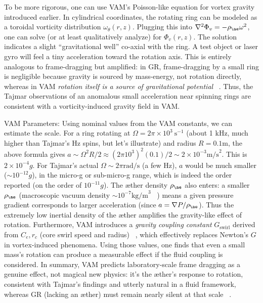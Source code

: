 \documentclass[a4paper, aps,preprint,superscriptaddress, 12pt]{revtex4}
\begin{document}
To be more rigorous, one can use VAM’s Poisson-like equation for vortex gravity introduced earlier. In cylindrical coordinates, the rotating ring can be modeled as a toroidal vorticity distribution $\omega_\theta(r,z)$. Plugging this into $\nabla^2\Phi_v = -\rho_{\ae}\omega^2$, one can solve (or at least qualitatively analyze) for $\Phi_v(r,z)$. The solution indicates a slight “gravitational well” co-axial with the ring. A test object or laser gyro will feel a tiny acceleration toward the rotation axis. This is entirely analogous to frame-dragging but amplified: in GR, frame-dragging by a small ring is negligible because gravity is sourced by mass-energy, not rotation directly, whereas in VAM \textit{rotation itself is a source of gravitational potential}~\cite{Iskandarani2025b} . Thus, the Tajmar observations of an anomalous small acceleration near spinning rings are consistent with a vorticity-induced gravity field in VAM.


VAM Parameters: Using nominal values from the VAM constants, we can estimate the scale. For a ring rotating at $\Omega = 2\pi\times10^3~\text{s}^{-1}$ (about 1 kHz, much higher than Tajmar’s Hz spins, but let’s illustrate) and radius $R=0.1\text{m}$, the above formula gives $a \sim \Omega^2 R /2 \approx (2\pi 10^3)^2(0.1)/2 \sim 2\times10^{-3}\text{m/s}^2$. This is $2\times10^{-4}g$. For Tajmar’s actual $\Omega \sim 2\pi\text{rad/s}$ (a few Hz), $a$ would be much smaller ($\sim10^{-12}g$), in the micro-g or sub-micro-g range, which is indeed the order reported (on the order of $10^{-11}g$). The æther density $\rho_{\ae}$ also enters: a smaller $\rho_{\ae}$ (macroscopic vacuum density $\sim10^{-7}\text{kg/m}^3$~\cite{VAM_constants} ) means a given pressure gradient corresponds to larger acceleration (since $a = \nabla P/\rho_{\ae}$). Thus the extremely low inertial density of the æther amplifies the gravity-like effect of rotation. Furthermore, VAM introduces a \textit{gravity coupling constant} $G_{\text{swirl}}$ derived from $C_e, r_c$ (core swirl speed and radius)~\cite{Iskandarani2025b} , which effectively replaces Newton’s $G$ in vortex-induced phenomena. Using those values, one finds that even a small mass’s rotation can produce a measurable effect if the fluid coupling is considered. In summary, VAM predicts laboratory-scale frame dragging as a genuine effect, not magical new physics: it’s the æther’s response to rotation, consistent with Tajmar’s findings and utterly natural in a fluid framework, whereas GR (lacking an æther) must remain nearly silent at that scale~\cite{Iskandarani2025b} .
\end{document}
